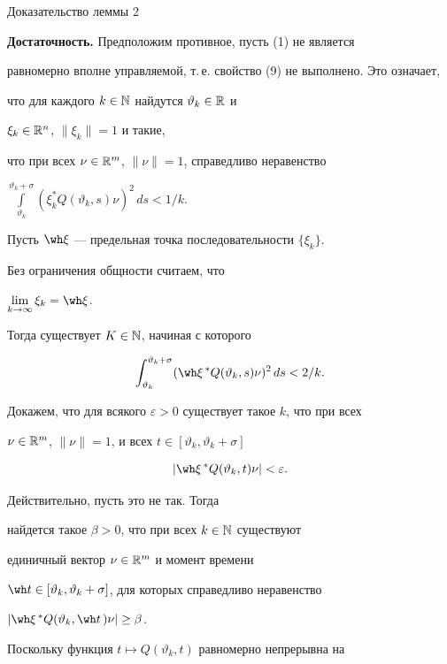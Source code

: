 \begin{pf*}{Доказательство леммы 2}


{\bf Достаточность.} Предположим противное, пусть (1) не является


равномерно вполне управляемой, т.\,е. свойство (9) не выполнено. Это означает,


что для каждого $k\in\Bbb N$ найдутся $\vartheta_k\in\Bbb R$ и


$\xi_k\in\Bbb R^n$, $\|\xi_k\|=1$ и такие,


что при всех $\nu\in\Bbb R^m$, $\|\nu\|=1$, справедливо неравенство


$\int\limits_{\vartheta_k}^{\vartheta_k+\sigma}


(\xi_k^*Q(\vartheta_k,s)\nu)^2\,ds<1/k$.


Пусть $\wh\xi$ --- предельная точка последовательности $\{\xi_k\}$.


Без ограничения общности считаем, что


$\lim\limits_{k\to\infty}\xi_{k}=\wh\xi$.


Тогда существует $K\in\Bbb N$, начиная с которого


\begin{equation}


\int_{\vartheta_k}^{\vartheta_k+\sigma}


(\wh\xi^{\,*}Q(\vartheta_k,s)\nu)^2\,ds<2/k.


\end{equation}


Докажем, что для всякого $\varepsilon>0$ существует такое $k$, что при всех


$\nu\in\Bbb R^m$, $\|\nu\|=1$, и всех $t\in[\vartheta_k,\vartheta_k+\sigma]$


\begin{equation}


|\wh\xi^{\,*}Q(\vartheta_k,t)\nu|<\varepsilon.


\end{equation}


Действительно, пусть это не так. Тогда


найдется такое $\beta>0$, что при всех $k\in\Bbb N$ существуют


единичный вектор $\nu\in\Bbb R^m$ и момент времени


$\wh t\in[\vartheta_k,\vartheta_k+\sigma]$, для которых справедливо неравенство


$|\wh\xi^{\,*}Q(\vartheta_k,\wh t\,)\nu|\ge\beta$.


Поскольку функция $t\mapsto Q(\vartheta_k,t)$ равномерно непрерывна на



\end{pf*}
